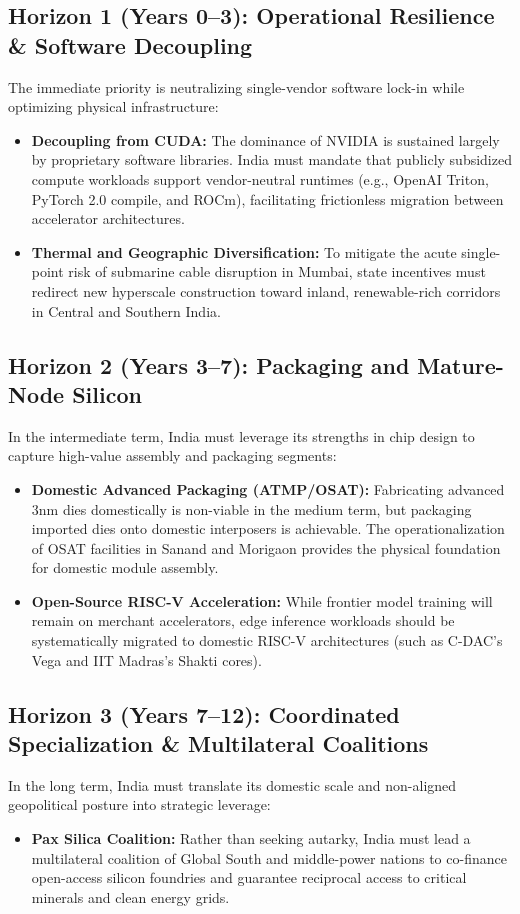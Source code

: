 \documentclass[conference,a4paper]{IEEEtran}
\begin{document}
\subsection{Horizon 1 (Years 0–3): Operational Resilience \& Software Decoupling}
The immediate priority is neutralizing single-vendor software lock-in while optimizing physical infrastructure:
\begin{itemize}
    \item \textbf{Decoupling from CUDA:} The dominance of NVIDIA is sustained largely by proprietary software libraries. India must mandate that publicly subsidized compute workloads support vendor-neutral runtimes (e.g., OpenAI Triton, PyTorch 2.0 compile, and ROCm), facilitating frictionless migration between accelerator architectures.
    \item \textbf{Thermal and Geographic Diversification:} To mitigate the acute single-point risk of submarine cable disruption in Mumbai, state incentives must redirect new hyperscale construction toward inland, renewable-rich corridors in Central and Southern India.
\end{itemize}

\subsection{Horizon 2 (Years 3–7): Packaging and Mature-Node Silicon}
In the intermediate term, India must leverage its strengths in chip design to capture high-value assembly and packaging segments:
\begin{itemize}
    \item \textbf{Domestic Advanced Packaging (ATMP/OSAT):} Fabricating advanced 3nm dies domestically is non-viable in the medium term, but packaging imported dies onto domestic interposers is achievable. The operationalization of OSAT facilities in Sanand and Morigaon provides the physical foundation for domestic module assembly.
    \item \textbf{Open-Source RISC-V Acceleration:} While frontier model training will remain on merchant accelerators, edge inference workloads should be systematically migrated to domestic RISC-V architectures (such as C-DAC's Vega and IIT Madras's Shakti cores).
\end{itemize}

\subsection{Horizon 3 (Years 7–12): Coordinated Specialization \& Multilateral Coalitions}
In the long term, India must translate its domestic scale and non-aligned geopolitical posture into strategic leverage:
\begin{itemize}
    \item \textbf{Pax Silica Coalition:} Rather than seeking autarky, India must lead a multilateral coalition of Global South and middle-power nations to co-finance open-access silicon foundries and guarantee reciprocal access to critical minerals and clean energy grids.
\end{itemize}
\end{document}
